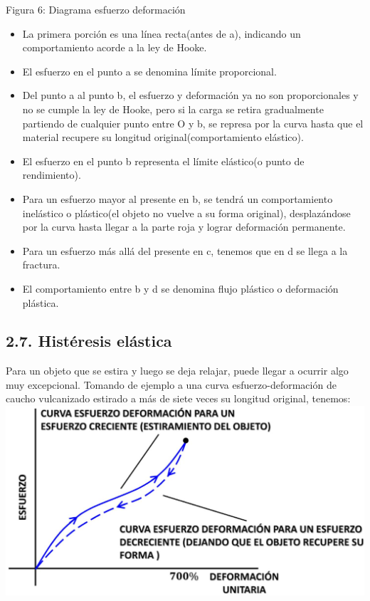 \documentclass[10pt]{article}
\begin{document}
Figura 6: Diagrama esfuerzo deformación

\begin{itemize}
  \item La primera porción es una línea recta(antes de a), indicando un comportamiento acorde a la ley de Hooke.
  \item El esfuerzo en el punto a se denomina límite proporcional.
  \item Del punto a al punto b, el esfuerzo y deformación ya no son proporcionales y no se cumple la ley de Hooke, pero si la carga se retira gradualmente partiendo de cualquier punto entre O y b, se represa por la curva hasta que el material recupere su longitud original(comportamiento elástico).
  \item El esfuerzo en el punto b representa el límite elástico(o punto de rendimiento).
  \item Para un esfuerzo mayor al presente en b, se tendrá un comportamiento inelástico o plástico(el objeto no vuelve a su forma original), desplazándose por la curva hasta llegar a la parte roja y lograr deformación permanente.
  \item Para un esfuerzo más allá del presente en c, tenemos que en d se llega a la fractura.
  \item El comportamiento entre b y d se denomina flujo plástico o deformación plástica.
\end{itemize}

\subsection*{2.7. Histéresis elástica}
Para un objeto que se estira y luego se deja relajar, puede llegar a ocurrir algo muy excepcional. Tomando de ejemplo a una curva esfuerzo-deformación de caucho vulcanizado estirado a más de siete veces su longitud original, tenemos:\\
\includegraphics[max width=\textwidth, center]{2025_04_28_a9941da8947ada55c6c9g-09}
\end{document}
